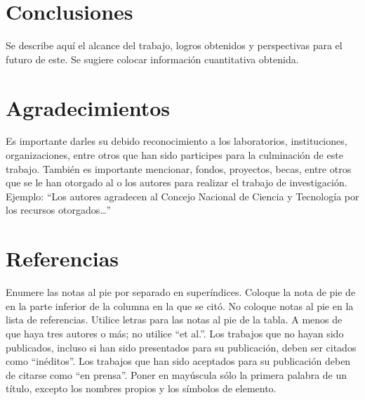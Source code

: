     \section{Conclusiones}
    
    Se describe aquí el alcance del trabajo, logros obtenidos y perspectivas para el futuro de este. Se sugiere colocar información cuantitativa obtenida.
    
    \section{Agradecimientos}
    
    Es importante darles su debido reconocimiento a los laboratorios, instituciones, organizaciones, entre otros que han sido participes para la culminación de este trabajo. También es importante mencionar, fondos, proyectos, becas, entre otros que se le han otorgado al o los autores para realizar el trabajo de investigación. Ejemplo: “Los autores agradecen al Concejo Nacional de Ciencia y Tecnología por los recursos otorgados…”
    
    \section*{Referencias}
    
    Enumere las notas al pie por separado en superíndices. Coloque la nota de pie de en la parte inferior de la columna en la que se citó. No coloque notas al pie en la lista de referencias. Utilice letras para las notas al pie de la tabla.
    A menos de que haya tres autores o más; no utilice “et al.”. Los trabajos que no hayan sido publicados, incluso si han sido presentados para su publicación, deben ser citados como “inéditos”. Los trabajos que han sido aceptados para su publicación deben de citarse como “en prensa”. Poner en mayúscula sólo la primera palabra de un título, excepto los nombres propios y los símbolos de elemento. 
    
    
